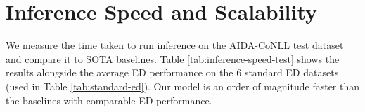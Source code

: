 \documentclass[11pt]{article}
\begin{document}
\begin{table}[h]
\centering
{}
\caption{Analysis of relation predictions for AIDA dataset with threshold 0.5.}
\label{tab:relation-analysis-aida}
\end{table}


\section{Inference Speed and Scalability}
We measure the time taken to run inference on the AIDA-CoNLL test dataset and compare it to SOTA baselines. Table \ref{tab:inference-speed-test} shows the results alongside the average
ED performance on the 6 standard ED datasets (used in Table \ref{tab:standard-ed}). Our model is an order of magnitude faster than the baselines with comparable ED performance.
\end{document}

